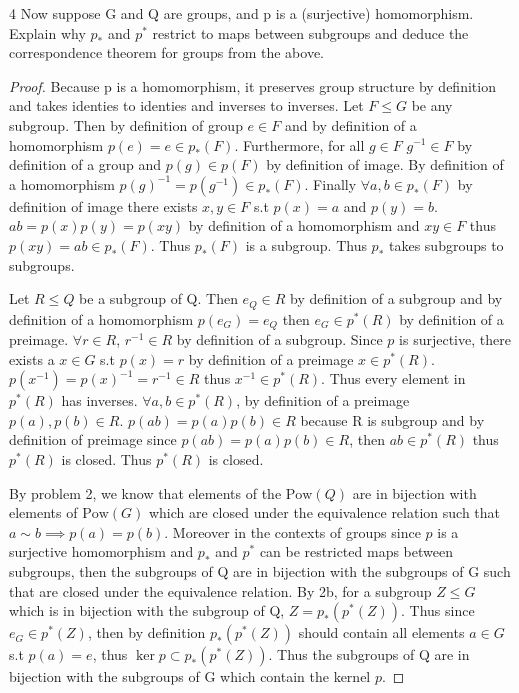 \documentclass{article}
\newcommand{\Pow}[0]{\text{Pow}}
\begin{document}
\begin{PROB}{4}\label{Problem 4.}
    Now suppose G and Q are groups, and p is a (surjective) homomorphism. Explain why $p_*$ and $p^*$ restrict to maps between subgroups and deduce the correspondence theorem for groups from the above.
\end{PROB}
\begin{proof}
    Because p is a homomorphism, it preserves group structure by definition and takes identies to identies and inverses to inverses. Let $F \leq G$ be any subgroup. Then by definition of group $e \in F$ and by definition of a homomorphism $p(e) = e \in p_*(F)$. Furthermore, for all $g \in F$ $g^{-1} \in F$ by definition of a group and $p(g) \in p(F)$ by definition of image. By definition of a homomorphism $p(g)^{-1} = p(g^{-1}) \in p_*(F)$. Finally $\forall a, b \in p_*(F)$ by definition of image there exists $x, y \in F$ s.t $p(x) = a$ and $p(y) = b$. $ab = p(x)p(y) = p(xy)$ by definition of a homomorphism and $xy \in F$ thus $p(xy) = ab \in p_*(F)$. Thus $p_*(F)$ is a subgroup. Thus $p_*$ takes subgroups to subgroups.

    Let $R \leq Q$ be a subgroup of Q. Then $e_Q \in R$ by definition of a subgroup and by definition of a homomorphism $p(e_G) = e_Q$ then $e_G \in p^*(R)$ by definition of a preimage. $\forall r \in R$, $r^{-1} \in R$ by definition of a subgroup. Since $p$ is surjective, there exists a $x \in G$ s.t $p(x) = r$ by definition of a preimage $x \in p^*(R)$. $p(x^{-1}) = p(x)^{-1} = r^{-1} \in R$ thus $x^{-1} \in p^*(R)$. Thus every element in $p^*(R)$ has inverses. $\forall a, b \in p^*(R)$, by definition of a preimage $p(a), p(b) \in R$. $p(ab) = p(a)p(b) \in R$ because R is subgroup and by definition of preimage since $p(ab) = p(a)p(b) \in R$, then $ab \in p^*(R)$ thus $p^*(R)$ is closed. Thus $p^*(R)$ is closed. 

    By problem 2, we know that elements of the $\Pow(Q)$ are in bijection with elements of $\Pow(G)$ which are closed under the equivalence relation such that $a \sim b \implies p(a)=p(b)$. Moreover in the contexts of groups since $p$ is a surjective homomorphism and $p_*$ and $p^*$ can be restricted maps between subgroups, then the subgroups of Q are in bijection with the subgroups of G such that are closed under the equivalence relation. By 2b, for a subgroup $Z \leq G$ which is in bijection with the subgroup of Q, $Z = p_*(p^*(Z))$. Thus since $e_G \in p^*(Z)$, then by definition $p_*(p^*(Z))$ should contain all elements $a \in G$ s.t $p(a) = e$, thus $\ker p \subset p_*(p^*(Z))$. Thus the subgroups of Q are in bijection with the subgroups of G which contain the kernel $p$.
\end{proof}
\end{document}
